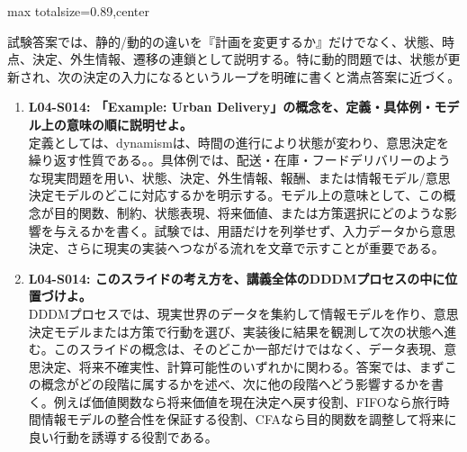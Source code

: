 \begin{minipage}[t]{0.58\textwidth}
\begin{adjustbox}{max totalsize={\textwidth}{0.89\textheight},center}
\begin{minipage}{\textwidth}
試験答案では、静的/動的の違いを『計画を変更するか』だけでなく、状態、時点、決定、外生情報、遷移の連鎖として説明する。特に動的問題では、状態が更新され、次の決定の入力になるというループを明確に書くと満点答案に近づく。\par{}\begin{enumerate}\item \textbf{L04-S014: 「Example: Urban Delivery」の概念を、定義・具体例・モデル上の意味の順に説明せよ。}\\定義としては、dynamismは、時間の進行により状態が変わり、意思決定を繰り返す性質である。。具体例では、配送・在庫・フードデリバリーのような現実問題を用い、状態、決定、外生情報、報酬、または情報モデル/意思決定モデルのどこに対応するかを明示する。モデル上の意味として、この概念が目的関数、制約、状態表現、将来価値、または方策選択にどのような影響を与えるかを書く。試験では、用語だけを列挙せず、入力データから意思決定、さらに現実の実装へつながる流れを文章で示すことが重要である。\item \textbf{L04-S014: このスライドの考え方を、講義全体のDDDMプロセスの中に位置づけよ。}\\DDDMプロセスでは、現実世界のデータを集約して情報モデルを作り、意思決定モデルまたは方策で行動を選び、実装後に結果を観測して次の状態へ進む。このスライドの概念は、そのどこか一部だけではなく、データ表現、意思決定、将来不確実性、計算可能性のいずれかに関わる。答案では、まずこの概念がどの段階に属するかを述べ、次に他の段階へどう影響するかを書く。例えば価値関数なら将来価値を現在決定へ戻す役割、FIFOなら旅行時間情報モデルの整合性を保証する役割、CFAなら目的関数を調整して将来に良い行動を誘導する役割である。\end{enumerate}
\end{minipage}
\end{adjustbox}
\end{minipage}


